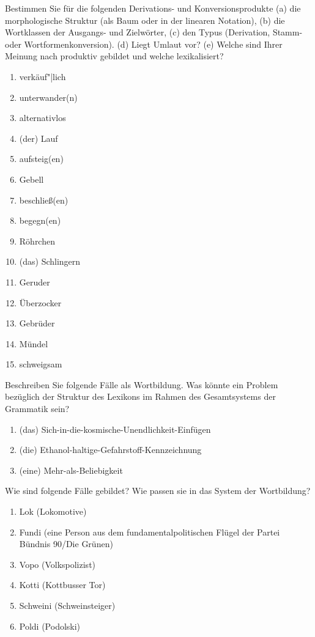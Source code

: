  \label{exc:wortbildung02} Bestimmen Sie für die folgenden Derivations- und Konversionsprodukte (a) die morphologische Struktur (als Baum oder in der linearen Notation), (b) die Wortklassen der Ausgangs- und Zielwörter, (c) den Typus (Derivation, Stamm- oder Wortformenkonversion). (d) Liegt Umlaut vor? (e) Welche sind Ihrer Meinung nach produktiv gebildet und welche lexikalisiert?

\begin{enumerate}
  \item verkäuf"|lich
  \item unterwander(n)
  \item alternativlos
  \item (der) Lauf
  \item aufsteig(en)
  \item Gebell
  \item beschließ(en)
  \item begegn(en)
  \item Röhrchen
  \item (das) Schlingern
  \item Geruder
  \item Überzocker
  \item Gebrüder
  \item Mündel
  \item schweigsam
\end{enumerate}

 \label{exc:wortbildung03} Beschreiben Sie folgende Fälle als Wortbildung.
Was könnte ein Problem bezüglich der Struktur des Lexikons im Rahmen des Gesamtsystems der Grammatik sein?

\begin{enumerate}
  \item (das) Sich-in-die-kosmische-Unendlichkeit-Einfügen
  \item (die) Ethanol-haltige-Gefahrstoff-Kennzeichnung
  \item (eine) Mehr-als-Beliebigkeit
\end{enumerate}

 \label{exc:wortbildung04} Wie sind folgende Fälle gebildet?
Wie passen sie in das System der Wortbildung?

\begin{enumerate}
  \item Lok (Lokomotive)
  \item Fundi (eine Person aus dem fundamentalpolitischen Flügel der Partei Bündnis 90\slash Die Grünen)
  \item Vopo (Volkspolizist)
  \item Kotti (Kottbusser Tor)
  \item Schweini (Schweinsteiger)
  \item Poldi (Podolski)
\end{enumerate}

